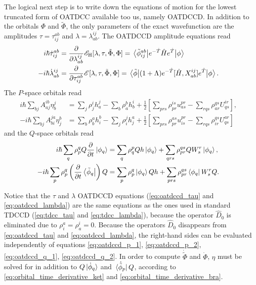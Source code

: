 The logical next step is to write down the equations of motion for the lowest 
truncated form of OATDCC available too us, namely OATDCCD. In addition to the 
orbitals $\Phi$ and $\tilde{\Phi}$, the only parameters of the exact wavefunction 
are the amplitudes $\tau = \tau^{ab}_{ij}$ and $\lambda = \lambda^{ij}_{ab}$. 
The OATDCCD amplitude equations read 
\begin{align}
    \label{eq:oatdccd_tau}
    i\hbar \dot{\tau}^{ab}_{ij} 
        &= \frac{\partial}{\partial \lambda^{ij}_{ab}}
            \mathscr{E}_{\text{H}}[\lambda, \tau, \tilde{\Phi}, \Phi]
        = \mel{\tilde{\phi}^{ab}_{ij}}
            {e^{-\hat{T}}\hat{H}e^{\hat{T}}}
        {\phi} \\
    \label{eq:oatdccd_lambda}
    -i\hbar\dot{\lambda}^{ij}_{ab}
        &= \frac{\partial}{\partial \tau^{ab}_{ij}}
            \mathscr{E}[\lambda, \tau, \tilde{\Phi}, \Phi]
        = \mel{\tilde{\phi}}
            {(1 + \Lambda)e^{-\hat{T}}[\hat{H}, X^{ij}_{ab}]e^{\hat{T}}}
            {\phi}.
\end{align}
The $P$-space orbitals read 
\begin{align}
    \label{eq:oatdccd_p_1}
    i\hbar\sum_{bj}A^{ib}_{aj} \eta^j_b
        &= \sum_j \rho^i_j h^j_a - \sum_b \rho^b_a h^i_b
        + \frac{1}{2}\left[
             \sum_{prs}\rho^{is}_{pr} u^{pr}_{as}
            -\sum_{rqs}\rho^{qs}_{ar} U^{ir}_{qs}
        \right], \\
    \label{eq:oatdccd_p_2}
    -i\hbar\sum_{bj}A^{ja}_{bi} \eta^b_j
        &= \sum_b \rho^a_b h^b_i - \sum_j \rho^j_i h^a_j
        + \frac{1}{2}\left[
             \sum_{prs}\rho^{as}_{pr} u^{pr}_{is}
            -\sum_{rqs}\rho^{qs}_{ir} U^{ar}_{qs}       
        \right]
\end{align}
and the $Q$-space orbitals read
\begin{align}
    \label{eq:oatdccd_q_1}
    i\hbar\sum_q \rho^q_p Q \frac{\partial}{\partial t} \ket{\phi_q}
        &= \sum_q \rho^p_q Q h\ket{\phi_q} 
            + \sum_{qrs} \rho^{qs}_{pr} Q W^r_s \ket{\phi_q}, \\
    \label{eq:oatdccd_q_2}
    -i\hbar\sum_p \rho^q_p
    \left(\frac{\partial}{\partial t} \bra{\tilde{\phi}_q}\right)Q
        &= \sum_p \rho^q_p \ket{\phi_q} Q h
            + \sum_{prs} \rho^{qs}_{pr}\bra{\phi_q} W^r_s Q.
\end{align}

Notice that the $\tau$ and $\lambda$ OATDCCD equations
(\autoref{eq:oatdccd_tau} and \autoref{eq:oatdccd_lambda}) are the 
same equations as the ones used in standard TDCCD
(\autoref{eq:tdcc_tau} and \autoref{eq:tdcc_lambda}), because the 
operator $\hat{D}_0$ is eliminated due to $\rho^a_i = \rho^i_a = 0$.
Because the operators $\hat{D}_0$ disappears from 
\autoref{eq:oatdccd_tau} and \autoref{eq:oatdccd_lambda},
the right-hand sides can be evaluated independently of 
equations \ref{eq:oatdccd_p_1}, \ref{eq:oatdccd_p_2},
\ref{eq:oatdccd_q_1}, \ref{eq:oatdccd_q_2}. In order to compute 
$\dot{\tilde{\Phi}}$ and $\dot{\Phi}$, $\eta$ must be solved for in 
addition to $Q\ket*{\dot{\phi}_q}$ and $\bra*{\dot{\tilde{\phi}}_p}Q$,
according to \autoref{eq:orbital_time_derivative_ket} and 
\autoref{eq:orbital_time_derivative_bra}.